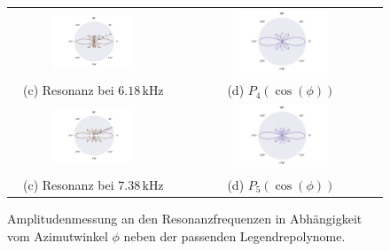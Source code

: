 \begin{figure}[H]
\begin{tabular}{cc}
  \includegraphics[width=0.5\textwidth]{Daten/Wasserstoff/peak2.pdf} &   \includegraphics[width=0.5\textwidth]{Daten/Wasserstoff/peakLeg2.pdf} \\
  (c) Resonanz bei $6.18 \,\si{\kilo\hertz}$ & (d) $P_4(\cos(\phi))$ \\[6pt]
  \includegraphics[width=0.5\textwidth]{Daten/Wasserstoff/peak3.pdf} &   \includegraphics[width=0.5\textwidth]{Daten/Wasserstoff/peakLeg3.pdf} \\
  (c) Resonanz bei $7.38 \,\si{\kilo\hertz}$ & (d) $P_5(\cos(\phi))$ \\[6pt]
  
  \end{tabular}
  \caption{Amplitudenmessung an den Resonanzfrequenzen in Abhängigkeit vom Azimutwinkel $\phi$ neben der passenden Legendrepolynome. } 
  \label{fig:hpeaks}
\end{figure}
